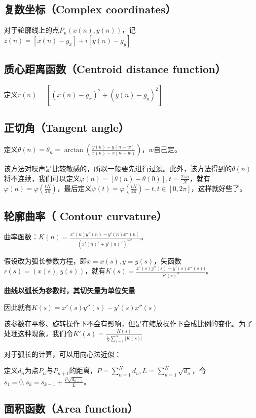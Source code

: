 \documentclass{ctexart}
\begin{document}
\subsection{复数坐标（Complex coordinates）}
对于轮廓线上的点$P_n(x(n),y(n))$，记$z(n)=[x(n)-g_x]+i[y(n)-g_y]$

\subsection{质心距离函数（Centroid distance function）}
定义$r(n)=[(x(n)-g_x)^2+(y(n)-g_y)^2]$

\subsection{正切角（Tangent angle）}

定义$\theta(n)=\theta_n=\arctan(\frac{y(n)-y(n-w)}{x(n)-x(n-w)})$，$w$自己定。

该方法对噪声是比较敏感的，所以一般要先进行过滤。此外，该方法得到的$\theta(n)$将不连续，我们可以定义$\varphi(n)=[\theta(n)-\theta(0)],t=\frac{2\pi n}{N}$，就有$\varphi(n)=\varphi(\frac{tN}{2\pi})$，最后定义$\psi(t)=\varphi(\frac{tN}{2\pi})-t,t \in [0,2\pi]$，这样就好些了。

\subsection{轮廓曲率（ Contour curvature）}
曲率函数：$K(n)=\frac{x'(n)y''(n)-y'(n)x''(n)}{(x'(n)^2+y'(n)^2)^{3/2}}$。

假设改为弧长参数方程，即$x=x(s),y=y(s)$，矢函数$r(s)=(x(s),y(s))$，就有$K(s)=\frac{x'(s)y''(s)-y'(s)x''(s))}{r'(s)^3}$。

\textbf{曲线以弧长为参数时，其切矢量为单位矢量}

因此就有$K(s)=x'(s)y''(s)-y'(s)x''(s)$

该参数在平移、旋转操作下不会有影响，但是在缩放操作下会成比例的变化。为了处理这种现象，我们令$K'(s)=\frac{K(s)}{\frac{1}{N}\sum_{s=1}^N|K(s)|}$

对于弧长的计算，可以用向心法近似：

定义$d_n$为点$P_n$与$P_{n+1}$的距离，$P=\sum\limits_{n=1}^Nd_n,L=\sum\limits_{n=1}^N\sqrt{d_n}$，令$s_1=0,s_k=s_{k-1}+\frac{P\sqrt{d_{k-1}}}{L}$。

\subsection{面积函数（Area function）}
\end{document}
